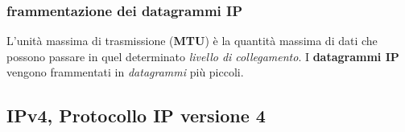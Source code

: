 \subsubsection{frammentazione dei datagrammi IP}
L'unità massima di trasmissione (\textbf{MTU}) è la quantità massima di dati che possono passare in quel determinato \textit{livello di collegamento}. 
I \textbf{datagrammi IP} vengono frammentati in \textit{datagrammi} più piccoli. 

\subsection{IPv4, Protocollo IP versione 4}

